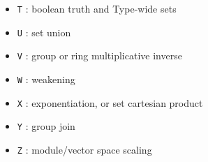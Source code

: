 \begin{itemize}
\begin{itemize}
\begin{itemize}
    \item {\tt T} : boolean truth and Type-wide sets
    \item {\tt U} : set union
    \item {\tt V} : group or ring multiplicative inverse
    \item {\tt W} : weakening
    \item {\tt X} : exponentiation, or set cartesian product
    \item {\tt Y} : group join
    \item {\tt Z} : module/vector space scaling
    \end{itemize}
  \end{itemize}
\end{itemize}




